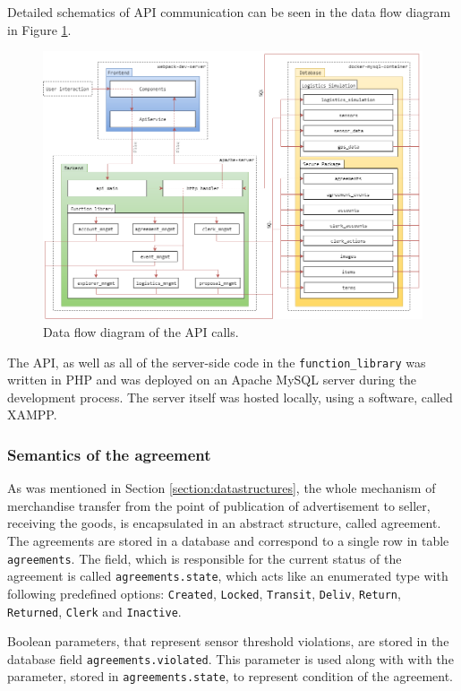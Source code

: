 Detailed schematics of API communication can be seen in the data flow diagram in Figure \ref{fig:dataflow}.

\begin{figure}[H]
\centering
\includegraphics[scale=0.49]{images/dataflow.png}
\caption{Data flow diagram of the API calls.}
\label{fig:dataflow}
\end{figure}

The API, as well as all of the server-side code in the \texttt{function\_library} was written in PHP and was deployed on an Apache MySQL server during the development process. The server itself was hosted locally, using a software, called XAMPP. 

\subsubsection{Semantics of the agreement} \label{section:statesofcontract}
As was mentioned in Section \ref{section:datastructures}, the whole mechanism of merchandise transfer from the point of publication of advertisement to seller, receiving the goods, is encapsulated in an abstract structure, called agreement. The agreements are stored in a database and correspond to a single row in table \texttt{agreements}. The field, which is responsible for the current status of the agreement is called \texttt{agreements.state}, which acts like an enumerated type with following predefined options: \texttt{Created}, \texttt{Locked}, \texttt{Transit}, \texttt{Deliv}, \texttt{Return}, \texttt{Returned}, \texttt{Clerk} and \texttt{Inactive}. 

Boolean parameters, that represent sensor threshold violations, are stored in the database field \texttt{agreements.violated}. This parameter is used along with with the parameter, stored in \texttt{agreements.state}, to represent condition of the agreement.

